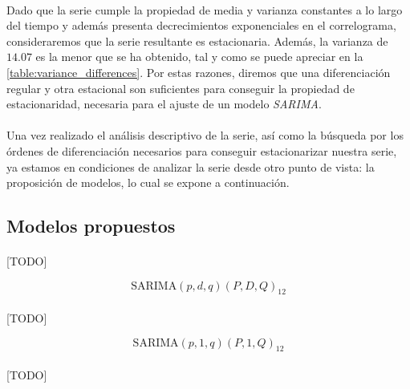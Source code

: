 \documentclass[a4paper, spanish]{article}
\begin{document}
        \paragraph{}
        Dado que la serie cumple la propiedad de media y varianza constantes a lo largo del tiempo y además presenta decrecimientos exponenciales en el correlograma, consideraremos que la serie resultante es estacionaria. Además, la varianza de $14.07$ es la menor que se ha obtenido, tal y como se puede apreciar en la \autoref{table:variance_differences}. Por estas razones, diremos que una diferenciación regular y otra estacional son suficientes para conseguir la propiedad de estacionaridad, necesaria para el ajuste de un modelo \emph{SARIMA}.

    \paragraph{}
    Una vez realizado el análisis descriptivo de la serie, así como la búsqueda por los órdenes de diferenciación necesarios para conseguir estacionarizar nuestra serie, ya estamos en condiciones de analizar la serie desde otro punto de vista: la proposición de modelos, lo cual se expone a continuación.

    \subsection{Modelos propuestos}
    \label{sec:proposed_models}

      \paragraph{}
      [TODO]

      \begin{equation}
      \label{eq:sarima}
        \text{SARIMA}(p, d, q)(P, D, Q)_{12}
      \end{equation}

      \paragraph{}
      [TODO]

      \begin{equation*}
        \text{SARIMA}(p, 1, q)(P, 1, Q)_{12}
      \end{equation*}

      \paragraph{}
      [TODO]
\end{document}

